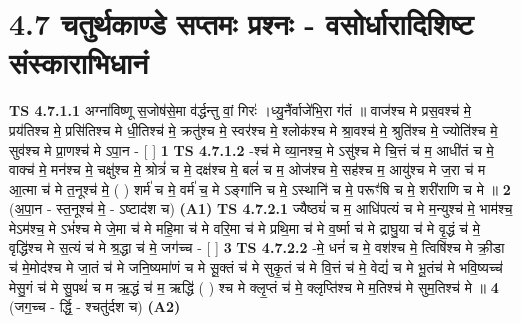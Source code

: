 \documentclass[17pt]{extarticle}
\begin{document}
     \section*{ 4.7     चतुर्थकाण्डे सप्तमः प्रश्नः - वसोर्धारादिशिष्ट संस्काराभिधानं }
                                        \textbf{ TS 4.7.1.1} \newline
                  अग्ना॑विष्णू स॒जोष॑से॒मा व॑र्द्धन्तु वां॒ गिरः॑ ।ध्यु॒नैंर्वाजे॑भि॒रा ग॑तं ॥ वाज॑श्च मे प्रस॒वश्च॑ मे॒ प्रय॑तिश्च मे॒ प्रसि॑तिश्च मे धी॒तिश्च॑ मे॒ क्रतु॑श्च मे॒ स्वर॑श्च मे॒ श्लोक॑श्च मे श्रा॒वश्च॑ मे॒ श्रुति॑श्च मे॒ ज्योति॑श्च मे॒ सुव॑श्च मे प्रा॒णश्च॑ मे ऽपा॒न - [  ] \textbf{  1} \newline
                  \newline
                                \textbf{ TS 4.7.1.2} \newline
                  -श्च॑ मे व्या॒नश्च॒ मे ऽसु॑श्च मे चि॒त्तं च॑ म॒ आधी॑तं च मे॒ वाक्च॑ मे॒ मन॑श्च मे॒ चक्षु॑श्च मे॒ श्रोत्रं॑ च मे॒ दक्ष॑श्च मे॒ बलं॑ च म॒ ओज॑श्च मे॒ सह॑श्च म॒ आयु॑श्च मे ज॒रा च॑ म आ॒त्मा च॑ मे त॒नूश्च॑ मे॒ ( ) शर्म॑ च मे॒ वर्म॑ च॒ मे ऽङ्गा॑नि च मे॒ ऽस्थानि॑ च मे॒ परूꣳ॑षि च मे॒ शरी॑राणि च मे ॥ \textbf{  2} \newline
                  \newline
                      (अ॒पा॒न - स्त॒नूश्च॑ मे॒ - ऽष्टाद॑श च)  \textbf{(A1)} \newline \newline
                                        \textbf{ TS 4.7.2.1} \newline
                  ज्यैष्ठ्यं॑ च म॒ आधि॑पत्यं च मे म॒न्युश्च॑ मे॒ भाम॑श्च॒ मेऽम॑श्च॒ मे ऽभं॑श्च मे जे॒मा च॑ मे महि॒मा च॑ मे वरि॒मा च॑ मे      प्रथि॒मा च॑ मे व॒र्ष्मा च॑ मे द्राघु॒या च॑ मे वृ॒द्धं च॑ मे॒      वृद्धि॑श्च मे स॒त्यं च॑ मे श्र॒द्धा च॑ मे॒ जग॑च्च - [  ] \textbf{  3} \newline
                  \newline
                                \textbf{ TS 4.7.2.2} \newline
                  -मे॒ धनं॑ च मे॒ वश॑श्च मे॒ त्विषि॑श्च मे क्री॒डा च॑ मे॒मोद॑श्च मे जा॒तं च॑ मे जनि॒ष्यमा॑णं च मे सू॒क्तं च॑ मे सुकृ॒तं च॑ मे वि॒त्तं च॑ मे॒ वेद्यं॑ च मे भू॒तंच॑ मे भवि॒ष्यच्च॑ मेसु॒गं च॑ मे सु॒पथं॑ च म ऋ॒द्धं च॑ म॒ ऋद्धि॑ ( ) श्च मे क्लृ॒प्तं च॑ मे॒    क्लृप्ति॑श्च मे म॒तिश्च॑ मे सुम॒तिश्च॑ मे ॥ \textbf{  4} \newline
                  \newline
                      (जग॒च्च - र्द्धि॒ - श्चतु॑र्दश च)  \textbf{(A2)} \newline \newline
\end{document}
